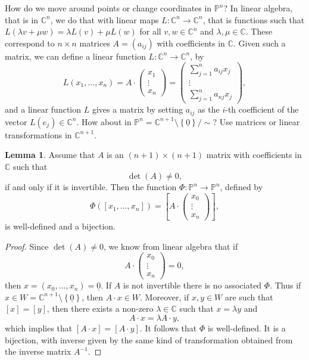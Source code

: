 \documentclass{article}
\newcommand{\C}{\mathbb{C}}
\renewcommand{\P}{\mathbb{P}}
\newcommand{\rb}[1]{\left( #1 \right)}
\renewcommand{\sb}[1]{\left[ #1 \right]}
\newcommand{\cb}[1]{\left\{ #1 \right\}}
\theoremstyle{definition}\newtheorem{definition}{Definition}[section]
\theoremstyle{definition}\newtheorem{notation}[definition]{Notation}
\theoremstyle{definition}\newtheorem{remark}[definition]{Remark}
\theoremstyle{definition}\newtheorem{example}[definition]{Example}
\theoremstyle{definition}\newtheorem{fact}{Fact}
\theoremstyle{definition}\newtheorem{exercise}{Exercise}
\newtheorem{lemma}[definition]{Lemma}
\begin{document}
How do we move around points or change coordinates in $ \P^n $? In linear algebra, that is in $ \C^n $, we do that with linear maps $ L : \C^n \to \C^n $, that is functions such that $ L\rb{\lambda v + \mu w} = \lambda L\rb{v} + \mu L\rb{w} $ for all $ v, w \in \C^n $ and $ \lambda, \mu \in \C $. These correspond to $ n \times n $ matrices $ A = \rb{a_{ij}} $ with coefficients in $ \C $. Given such a matrix, we can define a linear function $ L : \C^n \to \C^n $, by
$$ L\rb{x_1, \dots, x_n} = A \cdot \begin{pmatrix} x_1 \\ \vdots \\ x_n \end{pmatrix} = \begin{pmatrix} \sum_{j = 1}^n a_{ij}x_j \\ \vdots \\ \sum_{j = 1}^n a_{nj}x_j \end{pmatrix}, $$
and a linear function $ L $ gives a matrix by setting $ a_{ij} $ as the $ i $-th coefficient of the vector $ L\rb{e_j} \in \C^n $. How about in $ \P^n = \C^{n + 1} \setminus \cb{\underline{0}} / \sim $? Use matrices or linear transformations in $ \C^{n + 1} $.

\begin{lemma}
\label{lem:8.1}
Assume that $ A $ is an $ \rb{n + 1} \times \rb{n + 1} $ matrix with coefficients in $ \C $ such that
$$ \det\rb{A} \ne 0, $$
if and only if it is invertible. Then the function $ \Phi : \P^n \to \P^n $, defined by
$$ \Phi\rb{\sb{x_1, \dots, x_n}} = \sb{A \cdot \begin{pmatrix} x_0 \\ \vdots \\ x_n \end{pmatrix}}, $$
is well-defined and a bijection.
\end{lemma}

\begin{proof}
Since $ \det\rb{A} \ne 0 $, we know from linear algebra that if
$$ A \cdot \begin{pmatrix} x_0 \\ \vdots \\ x_n \end{pmatrix} = 0, $$
then $ x = \rb{x_0, \dots, x_n} = \underline{0} $. If $ A $ is not invertible there is no associated $ \Phi $. Thus if $ x \in W = \C^{n + 1} \setminus \cb{\underline{0}} $, then $ A \cdot x \in W $. Moreover, if $ x, y \in W $ are such that $ \sb{x} = \sb{y} $, then there exists a non-zero $ \lambda \in \C $ such that $ x = \lambda y $ and
$$ A \cdot x = \lambda A \cdot y, $$
which implies that $ \sb{A \cdot x} = \sb{A \cdot y} $. It follows that $ \Phi $ is well-defined. It is a bijection, with inverse given by the same kind of transformation obtained from the inverse matrix $ A^{-1} $.
\end{proof}
\end{document}
